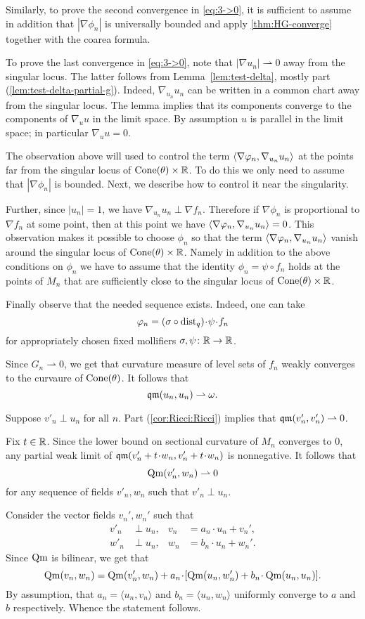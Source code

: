 Similarly, to prove the second convergence in \ref{eq:3->0}, it is sufficient to assume in addition that $|\nabla\phi_n|$ is universally bounded and apply \ref{thm:HG-converge} together with the coarea formula.

To prove the last convergence in \ref{eq:3->0}, note that
$|\nabla u_n|\rightharpoonup 0$ away from the singular locus.
The latter follows from Lemma~\ref{lem:test-delta}, mostly part (\ref{lem:test-delta-partial-g}).
Indeed, $\nabla_{u_n} u_n$ can be written in a common chart away from the singular locus. 
The lemma implies that its components converge to the components of $\nabla_u u$ in the limit space.
By assumption $u$ is parallel in the limit space; in particular $\nabla_uu=0$.

The observation above will used to control the term $\langle\nabla\varphi_n,\nabla_{u_n} {u_n}\rangle$ at the points far from the singular locus of $\operatorname{Cone}(\theta)\times \mathbb{R}$.
To do this we only need to assume that $|\nabla\phi_n|$ is bounded.
Next, we describe how to control it near the singularity.

Further, since $|u_n|=1$, we have $\nabla_{u_n} u_n\perp \nabla f_n$.
Therefore if $\nabla \phi_n$ is proportional to $\nabla f_n$ at some point, then at this point we have $\langle\nabla\varphi_n,\nabla_{u_n} {u_n}\rangle=0$.
This observation makes it possible to choose $\phi_n$ so that the term $\langle\nabla\varphi_n,\nabla_{u_n} {u_n}\rangle$ vanish around the singular locus of $\operatorname{Cone}(\theta)\times \mathbb{R}$.
Namely in addition to the above conditions on $\phi_n$ we have to assume that the identity $\phi_n=\psi\circ f_n$ holds at the points of $M_n$ that are sufficiently close to the singular locus of $\operatorname{Cone}(\theta)\times \mathbb{R}$.

Finally observe that the needed sequence exists.
Indeed, one can take 
\[\phi_n=(\sigma\circ \dist_q)\cdot \psi\cdot f_n\]
for appropriately chosen fixed mollifiers $\sigma,\psi\colon\mathbb{R}\to \mathbb{R}$.

Since $G_n\rightharpoonup 0$, we get that curvature measure of level sets of $f_n$ weakly converges to the curvaure of $\operatorname{Cone}(\theta)$.
It follows that 
\[\operatorname{\mathfrak{qm}}(u_n,u_n)\rightharpoonup \omega.\]

Suppose $v'_n\perp u_n$ for all $n$.
Part (\ref{cor:Ricci:Ricci}) implies that  $\operatorname{\mathfrak{qm}}(v'_n,v'_n)\rightharpoonup 0$.

Fix $t\in \mathbb{R}$.
Since the lower bound on sectional curvature of $M_n$ converges to $0$, any partial weak limit of $\qm(v'_n+t\cdot w_n,v'_n+t\cdot w_n)$ is nonnegative.
It follows that 
\[\operatorname{\rm Qm}(v'_n, w_n)\rightharpoonup 0\] for any sequence of fields $v'_n,w_n$ such that $v'_n\perp u_n$.

Consider the vector fields $v_n',w_n'$ such that 
\begin{align*}
v'_n&\perp u_n,
&
v_n&=a_n\cdot u_n+v_n',
\\
w'_n&\perp u_n,
&
w_n&=b_n\cdot u_n+w_n'.
\end{align*}
Since $\operatorname{\rm Qm}$ is bilinear, we get that
\[\Qm(v_n,w_n)=\Qm(v_n',w_n) + a_n\cdot [\Qm(u_n,w_n')+ b_n\cdot \Qm(u_n,u_n)].\]
By assumption, that $a_n=\langle u_n,v_n\rangle $ and $b_n=\langle u_n,w_n\rangle$ uniformly converge to $a$ and $b$ respectively.
Whence the statement follows.
\qeds


